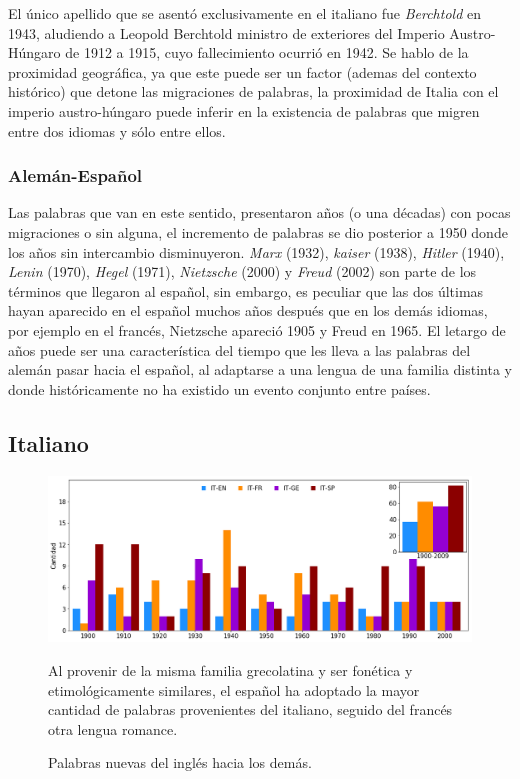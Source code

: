 El único apellido que se asentó exclusivamente en el  italiano fue \textit{Berchtold} en 1943, aludiendo a Leopold Berchtold ministro de exteriores del Imperio Austro-Húngaro de 1912 a 1915, cuyo fallecimiento ocurrió en 1942.  Se hablo de la proximidad geográfica, ya que este puede ser un factor (ademas del contexto histórico) que detone las migraciones de palabras, la proximidad de Italia con el imperio austro-húngaro puede inferir en la existencia de  palabras que migren entre  dos idiomas y sólo entre ellos. 

  
\subsubsection*{Alemán-Español}%

Las palabras que van en este sentido,  presentaron años (o una décadas)  con pocas migraciones o sin alguna, el incremento de palabras se dio posterior a 1950 donde los años sin intercambio disminuyeron.  \textit{Marx} (1932), \textit{kaiser} (1938), \textit{Hitler} (1940), \textit{Lenin} (1970), \textit{Hegel} (1971),  \textit{Nietzsche} (2000) y \textit{Freud} (2002) son parte de los términos que llegaron al español,  sin embargo, es peculiar que las dos últimas hayan aparecido en el español muchos años después que en los demás idiomas, por ejemplo en el francés,  Nietzsche apareció 1905 y Freud en 1965. El letargo de años puede ser una característica del tiempo que les lleva  a las  palabras del alemán pasar hacia el español, al adaptarse a una lengua de una familia distinta y donde históricamente no ha existido un evento conjunto entre países. 



\subsection{Italiano}%

\begin{figure}[h!]
	\centering
	\includegraphics[scale=.38]{Cap_3/NC_IT.png}
	\label{fig.NC_IT}
	\caption{Palabras nuevas del inglés hacia los demás.}
	\smallskip
	\small
	Al provenir de la misma familia grecolatina y ser fonética y etimológicamente similares, el español ha adoptado la mayor cantidad de palabras provenientes del italiano,  seguido del francés otra lengua romance.  
\end{figure}




